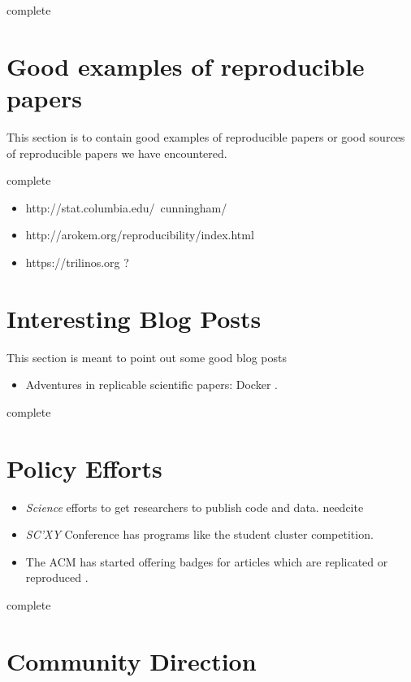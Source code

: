 \documentclass{article}
\newcommand{\complete}{
	\gls{complete}
}
\newcommand{\needcite}{
	\gls{needcite}
}
\begin{document}
\complete

\section{Good examples of reproducible papers}

This section is to contain good examples of reproducible papers or good sources of reproducible papers we have encountered.

\complete

\begin{itemize}
\item http://stat.columbia.edu/~cunningham/
\item http://arokem.org/reproducibility/index.html
\item https://trilinos.org ?
\end{itemize}

\section{Interesting Blog Posts}

This section is meant to point out some good blog posts

\begin{itemize}
\item Adventures in replicable scientific papers: Docker \cite{titus-brown-docker}.
\end{itemize}

\complete

\section{Policy Efforts}

\begin{itemize}
\item \textit{Science} efforts to get researchers to publish code and data. \needcite
\item \textit{SC'XY} Conference has programs like the student cluster competition. \cite{sighpc-connect-repro-1,sighpc-connect-repro-2}
\item The ACM has started offering badges for articles which are replicated or reproduced \cite{acm-badging-announcement}.
\end{itemize}

\complete

\section{Community Direction}
\end{document}
